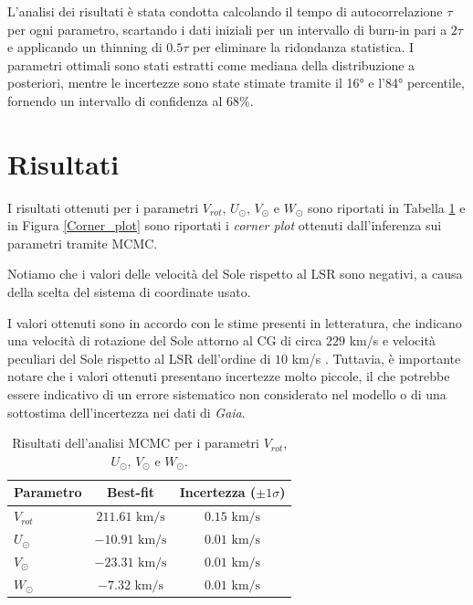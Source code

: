 \documentclass[twocolumn]{article}
\begin{document}
L'analisi dei risultati è stata condotta calcolando il tempo di autocorrelazione $\tau$ per ogni parametro, scartando i dati iniziali per un intervallo di burn-in pari a $2\tau$ e applicando un thinning di $0.5\tau$ per eliminare la ridondanza statistica. I parametri ottimali sono stati estratti come mediana della distribuzione a posteriori, mentre le incertezze sono state stimate tramite il 16° e l'84° percentile, fornendo un intervallo di confidenza al 68\%.


\section{Risultati}
I risultati ottenuti per i parametri $V_{rot}$, $U_\odot$, $V_\odot$ e $W_\odot$ sono riportati in Tabella \ref{tab:risultati_mcmc} e in Figura \ref{Corner_plot} sono riportati i \textit{corner plot} ottenuti dall'inferenza sui parametri tramite MCMC.

Notiamo che i valori delle velocità del Sole rispetto al LSR sono negativi, a causa della scelta del sistema di coordinate usato.

I valori ottenuti sono in accordo con le stime presenti in letteratura, che indicano una velocità di rotazione del Sole attorno al CG di circa $229$ km/s \cite{Eilers2019} e velocità peculiari del Sole rispetto al LSR dell'ordine di $10$ km/s \cite{Schonrich2010}. Tuttavia, è importante notare che i valori ottenuti presentano incertezze molto piccole, il che potrebbe essere indicativo di un errore sistematico non considerato nel modello o di una sottostima dell'incertezza nei dati di {\it Gaia}.

\begin{table}[h!]
    \centering
    \caption{Risultati dell'analisi MCMC per i parametri $V_{rot}$, $U_\odot$, $V_\odot$ e $W_\odot$.}  
    \label{tab:risultati_mcmc}
    \begin{tabular}{lcc}
    \hline
    \hline
    \textbf{Parametro} & \textbf{Best-fit} & \textbf{Incertezza ($\pm 1\sigma$)} \\
    \hline
    $V_{rot}$ & $211.61 \text{ km/s}$ & $0.15 \text{ km/s}$ \\
    $U_\odot$  & $-10.91 \text{ km/s}$ & $0.01 \text{ km/s}$ \\
    $V_\odot$ & $-23.31 \text{ km/s}$ & $0.01 \text{ km/s}$ \\
    $W_\odot$ & $-7.32 \text{ km/s}$  & $0.01 \text{ km/s}$ \\
    \hline
    \hline
    \end{tabular}
\end{table}
\end{document}
